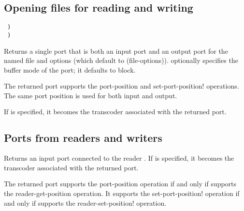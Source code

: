 \subsection{Opening files for reading and writing}

\begin{entry}{%
{\tt\hspace*{4em} )}\\
{\tt\hspace*{4em}  )}}
   
Returns a single port that is both an input port and an output
port for the named file and options (which default to {\cf
  (file-options)}).   optionally specifies the buffer
mode of the port; it defaults to {\cf block}.
   
The returned port supports the {\cf port-position} and {\cf
  set-port-position!}  operations. The same port position is used for
both input and output.

If  is specified, it becomes the transcoder associated
with the returned port.
\end{entry}

\subsection{Ports from readers and writers}

\begin{entry}{%
}

Returns an input port connected to the reader .
If  is specified, it becomes the transcoder associated
with the returned port.

The returned port supports the {\cf port-position} operation if and
only if  supports the {\cf reader-get-position} operation.
It supports the {\cf set-port-position!} operation if and
only if  supports the {\cf reader-set-position!} operation.
\end{entry}   

